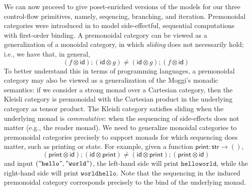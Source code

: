 \documentclass[acmsmall,screen,review]{acmart}
\newcommand{\ms}[1]{\ensuremath{\mathsf{#1}}}
\begin{document}
We can now proceed to give poset-enriched versions of the models for our three control-flow
primitives, namely, seqencing, branching, and iteration. Premonoidal categories were introduced in
\citet{power-premonoidal-97} to model side-effectful, sequential computations with first-order
binding. A premonoidal category can be viewed as a generalization of a monoidal category, in which
\emph{sliding} does not necessarily hold; i.e., we have that, in general,
$$
(f \otimes \ms{id}) ; (\ms{id} \otimes g) \neq
(\ms{id} \otimes g) ; (f \otimes \ms{id})
$$
To better understand this in terms of programming languages, a premonoidal
category may also be viewed as a generalization of the Moggi's \cite{moggi-91-monad} monadic
semantics: if we consider a strong monad over a Cartesian category, then the Kleisli category is
premonoidal with the Cartesian product in the underlying category as tensor product. The Kleisli
category satisfies sliding when the underlying monad is
\emph{commutative}: when the sequencing of
side-effects does not matter (e.g., the reader monad). We need to generalize monoidal categories to premonoidal categories
precisely to support monads for which sequencing does matter, such as printing or state. For
example, given a function $\ms{print}: \ms{str} \to ()$,
$$
(\ms{print} \otimes \ms{id}) ; (\ms{id} \otimes \ms{print}) \neq
(\ms{id} \otimes \ms{print}) ; (\ms{print} \otimes \ms{id}) 
$$
and input $(\mathtt{"hello"}, \mathtt{"world"})$, the left-hand side will print $\mathtt{hello
world}$, while the right-hand side will print $\mathtt{world hello}$. Note that the sequencing in
the induced premonoidal category corresponds precisely to the bind of the underlying monad.
\end{document}
